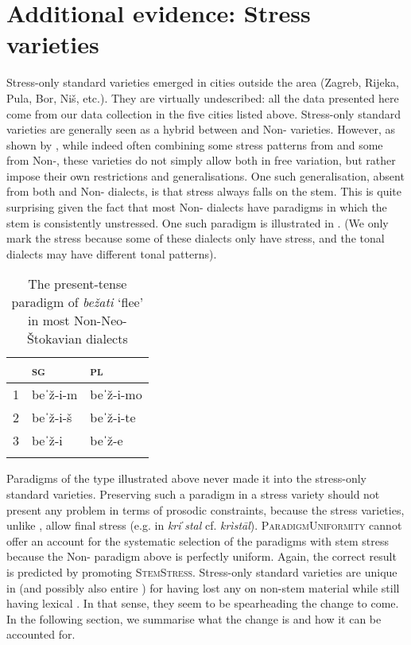 \documentclass[output=paper,nonflat,colorlinks,citecolor=brown,newtxmath]{langsci/langscibook}
\begin{document}
\section{Additional evidence: Stress varieties} \label{sec:kager:4}
Stress-only standard varieties emerged in cities outside the  area (Zagreb, Rijeka, Pula, Bor, Niš, etc.). They are virtually undescribed: all the data presented here come from our data collection in the five cities listed above.
Stress-only standard varieties are generally seen as a hybrid between  and Non- varieties. However, as shown by \citet{SimonovicKager2017}, while indeed often combining some stress patterns from  and some from Non-, these varieties do not simply allow both in free variation, but rather impose their own restrictions and generalisations. One such generalisation, absent from both  and Non- dialects, is that stress always falls on the stem. This is quite surprising given the fact that most Non- dialects have paradigms in which the stem is consistently unstressed. One such paradigm is illustrated in  . (We only mark the stress because some of these dialects only have stress, and the tonal dialects may have different tonal patterns).

\begin{table}
\caption{The present-tense paradigm of \textit{bežati} `flee' in most Non-Neo-Štokavian dialects}
\label{tab:kager:10}
 \begin{tabular}{ l  l  l }
  \lsptoprule
& \textsc{sg}  & \textsc{pl} \\
 \midrule
 1  &  beˈž-i-m  &   beˈž-i-mo \\
2  &  beˈž-i-š  & beˈž-i-te \\
3  &  beˈž-i & beˈž-e \\
  \lspbottomrule
 \end{tabular}
\end{table}

\newpage
Paradigms of the type illustrated above never made it into the stress-only standard varieties. Preserving such a paradigm in a stress variety should not present any problem in terms of prosodic constraints, because the stress varieties, unlike , allow final stress (e.g. in \textit{kriˈstal} cf.  \textit{krìstāl}). \textsc{ParadigmUniformity} cannot offer an account for the systematic selection of the paradigms with stem stress because the Non- paradigm above is perfectly uniform. Again, the correct result is predicted by promoting \textsc{StemStress}. Stress-only standard  varieties are unique in  (and possibly also entire ) for having lost any  on non-stem material while still having lexical . In that sense, they seem to be spearheading the change to come.
In the following section, we summarise what the change is and how it can be accounted for.
\end{document}

